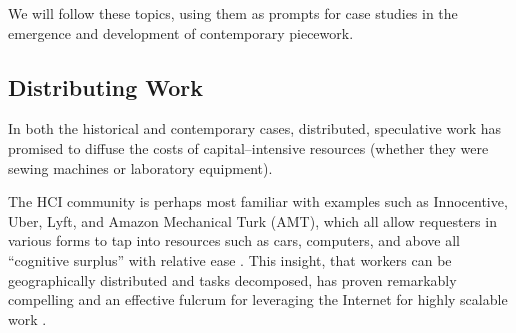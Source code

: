 \documentclass{sigchi}
\newcommand{\msb}[1]{{\color{PineGreen}[MSB: #1]}}
\begin{document}
We will follow these topics, using them as prompts for case studies in
the emergence and
development of contemporary piecework.

\subsection{Distributing Work}
In both the historical and contemporary cases,
distributed, speculative work
has promised
to diffuse the costs of capital--intensive resources
(whether they were sewing machines or laboratory equipment).


The HCI community is perhaps most familiar with examples such as
Innocentive,
Uber, Lyft,
and Amazon Mechanical Turk (AMT),
which all allow requesters in various forms to tap into
resources such as
cars,
computers, and above all
``cognitive surplus''
with relative ease
\cite{howe2006rise,DillahuntPromise,storiesIraniSilberman,shirky2010cognitive}.
This insight, that
workers can be geographically distributed and tasks decomposed,
has proven remarkably compelling
and an effective fulcrum for leveraging the Internet for highly scalable work
\cite{sensitiveTasks,embracingErrorKrishna}.
\end{document}
